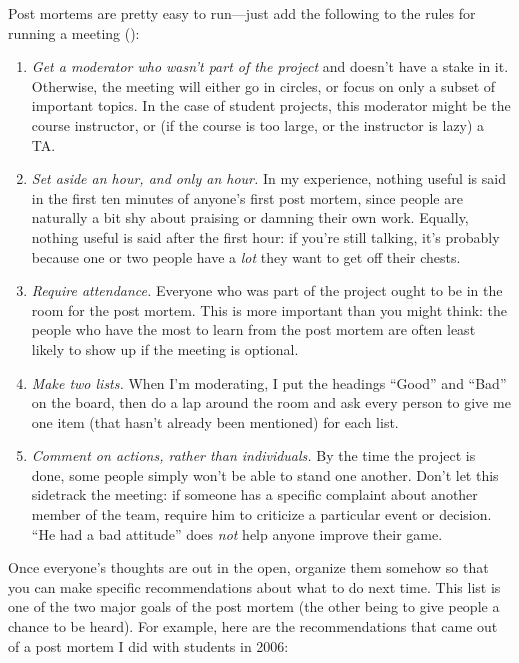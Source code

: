 \documentclass{report}
\begin{document}
Post mortems are pretty easy to run---just add the following to the
rules for running a meeting ():

\begin{enumerate}

  \item \emph{Get a moderator who wasn't part of the project} and
  doesn't have a stake in it.  Otherwise, the meeting will either go
  in circles, or focus on only a subset of important topics.  In the
  case of student projects, this moderator might be the course
  instructor, or (if the course is too large, or the instructor is
  lazy) a TA.

  \item \emph{Set aside an hour, and only an hour.} In my experience,
  nothing useful is said in the first ten minutes of anyone's first
  post mortem, since people are naturally a bit shy about praising or
  damning their own work.  Equally, nothing useful is said after the
  first hour: if you're still talking, it's probably because one or
  two people have a \emph{lot} they want to get off their chests.

  \item \emph{Require attendance.} Everyone who was part of the
  project ought to be in the room for the post mortem.  This is more
  important than you might think: the people who have the most to
  learn from the post mortem are often least likely to show up if the
  meeting is optional.

  \item \emph{Make two lists.} When I'm moderating, I put the headings
  ``Good'' and ``Bad'' on the board, then do a lap around the room and
  ask every person to give me one item (that hasn't already been
  mentioned) for each list.

  \item \emph{Comment on actions, rather than individuals.} By the
  time the project is done, some people simply won't be able to stand
  one another.  Don't let this sidetrack the meeting: if someone has a
  specific complaint about another member of the team, require him to
  criticize a particular event or decision.  ``He had a bad attitude''
  does \emph{not} help anyone improve their game.

\end{enumerate}

Once everyone's thoughts are out in the open, organize them somehow so
that you can make specific recommendations about what to do next time.
This list is one of the two major goals of the post mortem (the other
being to give people a chance to be heard).  For example, here are the
recommendations that came out of a post mortem I did with students in
2006:
\end{document}
